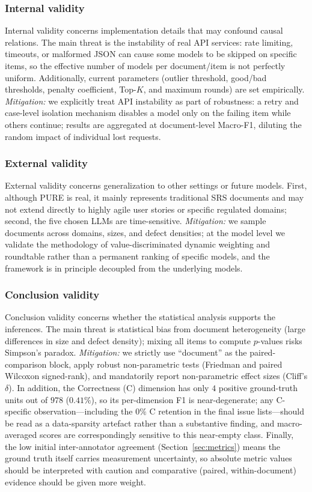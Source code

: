\documentclass[sn-mathphys-num]{sn-jnl}
\begin{document}
\subsubsection{Internal validity}
Internal validity concerns implementation details that may confound causal relations. The main threat is the instability of real API services: rate limiting, timeouts, or malformed JSON can cause some models to be skipped on specific items, so the effective number of models per document/item is not perfectly uniform. Additionally, current parameters (outlier threshold, good/bad thresholds, penalty coefficient, Top-$K$, and maximum rounds) are set empirically. \textit{Mitigation:} we explicitly treat API instability as part of robustness: a retry and case-level isolation mechanism disables a model only on the failing item while others continue; results are aggregated at document-level Macro-F1, diluting the random impact of individual lost requests.

\subsubsection{External validity}
External validity concerns generalization to other settings or future models. First, although PURE is real, it mainly represents traditional SRS documents and may not extend directly to highly agile user stories or specific regulated domains; second, the five chosen LLMs are time-sensitive. \textit{Mitigation:} we sample documents across domains, sizes, and defect densities; at the model level we validate the methodology of value-discriminated dynamic weighting and roundtable rather than a permanent ranking of specific models, and the framework is in principle decoupled from the underlying models.

\subsubsection{Conclusion validity}
Conclusion validity concerns whether the statistical analysis supports the inferences. The main threat is statistical bias from document heterogeneity (large differences in size and defect density); mixing all items to compute $p$-values risks Simpson's paradox. \textit{Mitigation:} we strictly use ``document'' as the paired-comparison block, apply robust non-parametric tests (Friedman and paired Wilcoxon signed-rank), and mandatorily report non-parametric effect sizes (Cliff's $\delta$). In addition, the Correctness (C) dimension has only $4$ positive ground-truth units out of $978$ ($0.41\%$), so its per-dimension F1 is near-degenerate; any C-specific observation---including the $0\%$ C retention in the final issue lists---should be read as a data-sparsity artefact rather than a substantive finding, and macro-averaged scores are correspondingly sensitive to this near-empty class. Finally, the low initial inter-annotator agreement (Section~\ref{sec:metrics}) means the ground truth itself carries measurement uncertainty, so absolute metric values should be interpreted with caution and comparative (paired, within-document) evidence should be given more weight.
\end{document}
